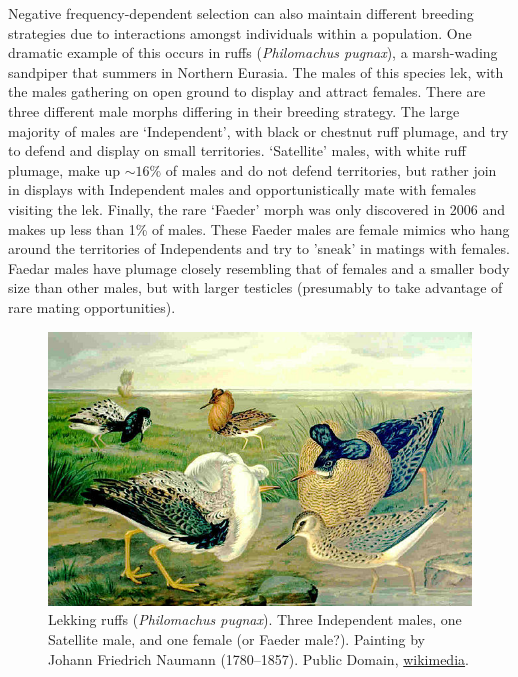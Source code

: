 Negative frequency-dependent selection can also maintain different 
breeding strategies due to interactions amongst individuals within a population. One
dramatic example of this occurs in ruffs ({\it Philomachus pugnax}), a
marsh-wading sandpiper that summers in Northern Eurasia. The males of this species
lek, with the males gathering on open ground to display and attract females. There are three different male morphs differing in their breeding
strategy. The large majority of males are `Independent', with black or
chestnut ruff plumage, and try to defend and display on small territories. `Satellite' males, with white ruff plumage, make
up $\sim 16\%$ of males and do not defend territories, but rather join
in displays with Independent males and opportunistically mate with
females visiting the lek. Finally, the rare `Faeder' morph was only discovered
in 2006 \citep{jukema2006permanent} and makes up less than 1\% of males. These Faeder males are female mimics who hang
around the territories of Independents and try to 'sneak' in matings with females. Faedar males have plumage closely resembling
that of females and a smaller body size than other males, but with larger testicles (presumably to
take advantage of rare mating opportunities).
\begin{figure}
\begin{center}   %
  \includegraphics[width = 0.8 \textwidth]{illustration_images/single_locus_selection/Ruffs/Philomachus_pugnax_naumann.jpg}
\end{center}
\caption{Lekking ruffs ({\it Philomachus pugnax}). Three Independent males, one Satellite male, and one female
(or Faeder male?). {\newline \noindent  \tiny{ Painting by Johann
    Friedrich Naumann (1780–1857). Public Domain,
    \href{https://en.wikipedia.org/wiki/Ruff\#/media/File:Philomachus_pugnax_naumann.jpg}{wikimedia}.}}}\label{fig:Ruff}  
\end{figure}

